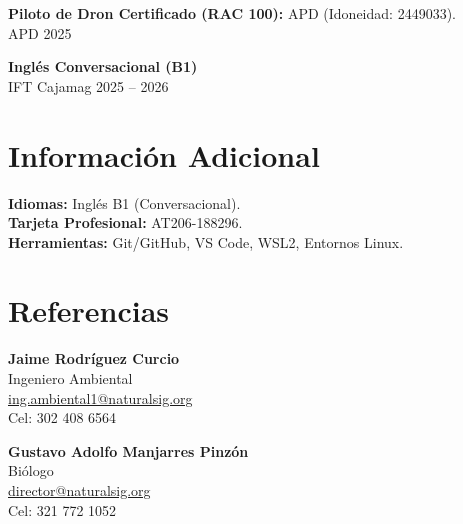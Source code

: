 \documentclass[11pt,a4paper]{article}
\begin{document}
\textbf{Piloto de Dron Certificado (RAC 100):} APD (Idoneidad: 2449033). \\
APD \hfill 2025

\textbf{Inglés Conversacional (B1)} \\
IFT Cajamag \hfill 2025 -- 2026

\section*{Información Adicional}

\textbf{Idiomas:} Inglés B1 (Conversacional). \\
\textbf{Tarjeta Profesional:} AT206-188296. \\
\textbf{Herramientas:} Git/GitHub, VS Code, WSL2, Entornos Linux.

\section*{Referencias}

\textbf{Jaime Rodríguez Curcio} \\
Ingeniero Ambiental \\
\href{mailto:ing.ambiental1@naturalsig.org}{ing.ambiental1@naturalsig.org} \\
Cel: 302 408 6564

\vspace{2mm}

\textbf{Gustavo Adolfo Manjarres Pinzón} \\
Biólogo \\
\href{mailto:director@naturalsig.org}{director@naturalsig.org} \\
Cel: 321 772 1052
\end{document}

